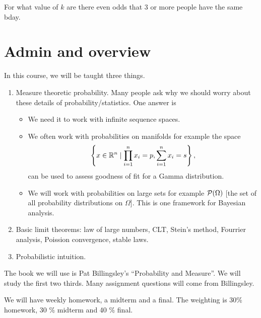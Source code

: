 \begin{exer}
    For what value of $k$ are there even odds that 3 or more people have the same bday.
\end{exer}

\section{Admin and overview}
In this course, we will be taught three things.
\begin{enumerate}
    \item Measure theoretic probability. Many people ask why we should worry about these details of probability/statistics. One answer is
    \begin{itemize}
        \item We need it to work with infinite sequence spaces.
        \item We often work with probabilities on manifolds for example the space \[\left\{x \in {\mathbb R}^n \mid \prod_{i=1}^n x_i = p, \sum_{i=1}^n x_i = s \right\},\]
        can be used to assess goodness of fit for a Gamma distribution.
        \item We will work with probabilities on large sets for example ${\mathcal{P}}(\Omega)$ [the set of all probability distributions on $\Omega$]. This is one framework for Bayesian analysis.
    \end{itemize}
    \item Basic limit theorems: law of large numbers, CLT, Stein's method, Fourrier analysis, Poission convergence, stable laws.
    \item Probabilistic intuition.
\end{enumerate}

The book we will use is Pat Billingsley's ``Probability and Measure''. We will study the first two thirds. Many assignment questions will come from Billingsley.  

We will have weekly homework, a midterm and a final. The weighting is 30\% homework, 30 \% midterm and 40 \% final.

